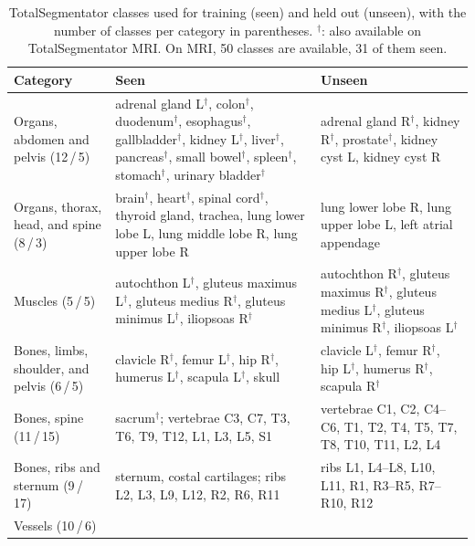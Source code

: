 \documentclass[hidelinks, a4paper, 12pt, ngerman, english]{article}  %
\begin{document}
\begin{table}[p]
  \centering
  \small
  \caption{TotalSegmentator classes used for training (seen) and held out
  (unseen), with the number of classes per category in parentheses.
  $^\dagger$: also available on TotalSegmentator MRI. On MRI, 50 classes are
  available, 31 of them seen.}
  \label{tab:totalseg-classes}
  \begin{tabularx}{\linewidth}{@{}p{3.2cm}XX@{}}
    \toprule
    Category & Seen & Unseen \\
    \midrule
    Organs, abdomen and pelvis (12\,/\,5)
      & adrenal gland L$^\dagger$, colon$^\dagger$, duodenum$^\dagger$,
        esophagus$^\dagger$, gallbladder$^\dagger$, kidney L$^\dagger$,
        liver$^\dagger$, pancreas$^\dagger$, small bowel$^\dagger$,
        spleen$^\dagger$, stomach$^\dagger$, urinary bladder$^\dagger$
      & adrenal gland R$^\dagger$, kidney R$^\dagger$, prostate$^\dagger$,
        kidney cyst L, kidney cyst R \\
    \addlinespace
    Organs, thorax, head, and spine (8\,/\,3)
      & brain$^\dagger$, heart$^\dagger$, spinal cord$^\dagger$, thyroid
        gland, trachea, lung lower lobe L, lung middle lobe R, lung upper
        lobe R
      & lung lower lobe R, lung upper lobe L, left atrial appendage \\
    \addlinespace
    Muscles (5\,/\,5)
      & autochthon L$^\dagger$, gluteus maximus L$^\dagger$, gluteus medius
        R$^\dagger$, gluteus minimus L$^\dagger$, iliopsoas R$^\dagger$
      & autochthon R$^\dagger$, gluteus maximus R$^\dagger$, gluteus medius
        L$^\dagger$, gluteus minimus R$^\dagger$, iliopsoas L$^\dagger$ \\
    \addlinespace
    Bones, limbs, shoulder, and pelvis (6\,/\,5)
      & clavicle R$^\dagger$, femur L$^\dagger$, hip R$^\dagger$, humerus
        L$^\dagger$, scapula L$^\dagger$, skull
      & clavicle L$^\dagger$, femur R$^\dagger$, hip L$^\dagger$, humerus
        R$^\dagger$, scapula R$^\dagger$ \\
    \addlinespace
    Bones, spine (11\,/\,15)
      & sacrum$^\dagger$; vertebrae C3, C7, T3, T6, T9, T12, L1, L3, L5, S1
      & vertebrae C1, C2, C4--C6, T1, T2, T4, T5, T7, T8, T10, T11, L2, L4 \\
    \addlinespace
    Bones, ribs and sternum (9\,/\,17)
      & sternum, costal cartilages; ribs L2, L3, L9, L12, R2, R6, R11
      & ribs L1, L4--L8, L10, L11, R1, R3--R5, R7--R10, R12 \\
    \addlinespace
    Vessels (10\,/\,6)

\end{tabularx}
\end{table}
\end{document}
